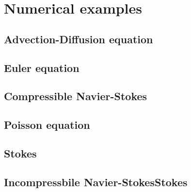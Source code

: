 \section{Numerical examples}


\subsection{Advection-Diffusion equation}

\subsection{Euler equation}

\subsection{Compressible Navier-Stokes}

\subsection{Poisson equation}

\subsection{Stokes}

\subsection{Incompressbile Navier-StokesStokes}

